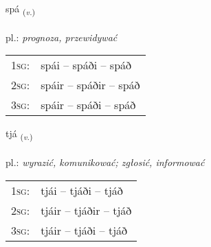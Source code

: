 \documentclass[frontgrid, backgrid]{flacards}\usepackage[]{graphicx}\usepackage[]{xcolor}
\begin{document}
\renewcommand{\flhead}{\vskip5pt \fboxsep=0pt {\small\bfseries\footnotesize Sagnorð | Verb}}
\renewcommand{\fcfoot}{\vskip5pt \fboxsep=0pt \hspace{2pt}{\small\bfseries\footnotesize 2K}}

\renewcommand{\blhead}{\vskip5pt {\small\bfseries\footnotesize Sagnorð | Verb }}
\renewcommand{\bcfoot}{\vskip5pt \hspace{2pt}{\small\bfseries\footnotesize 2K}}


{spá \small{\textsubscript{(\textit{v.})}} \\[1ex] %
\textphonetic{[spauː]} \\
pl.: \emph{prognoza, przewidywać} \\  [2ex]
\renewcommand*{\arraystretch}{0.8}
\begin{tabular}{p{1cm}l}
\textsc{1sg}: & spái -- spáði -- spáð \\ 
\textsc{2sg}: & spáir -- spáðir -- spáð \\ 
\textsc{3sg}: & spáir -- spáði -- spáð \\ 
\end{tabular}
}

\renewcommand{\flhead}{\vskip5pt \fboxsep=0pt {\small\bfseries\footnotesize Sagnorð | Verb}}
\renewcommand{\fcfoot}{\vskip5pt \fboxsep=0pt \hspace{2pt}{\small\bfseries\footnotesize 2K}}

\renewcommand{\blhead}{\vskip5pt {\small\bfseries\footnotesize Sagnorð | Verb }}
\renewcommand{\bcfoot}{\vskip5pt \hspace{2pt}{\small\bfseries\footnotesize 2K}}


{tjá \small{\textsubscript{(\textit{v.})}} \\[1ex] %
\textphonetic{[tʰjauː]} \\
pl.: \emph{wyrazić, komunikować; zgłosić, informować} \\  [2ex]
\renewcommand*{\arraystretch}{0.8}
\begin{tabular}{p{1cm}l}
\textsc{1sg}: & tjái -- tjáði -- tjáð \\ 
\textsc{2sg}: & tjáir -- tjáðir -- tjáð \\ 
\textsc{3sg}: & tjáir -- tjáði -- tjáð \\ 
\end{tabular}
}
\end{document}
